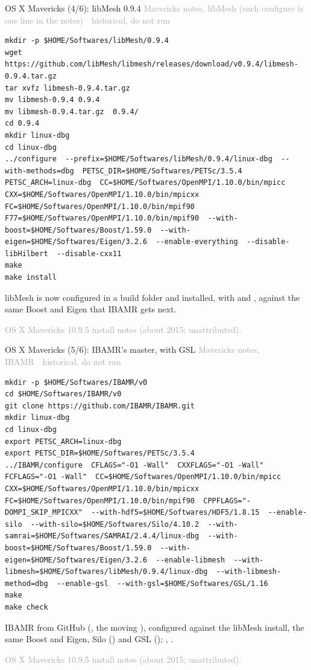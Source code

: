 \documentclass[aspectratio=169,11pt]{beamer}
\newcommand{\sourcecredit}[1]{\vfill\begin{flushright}\tiny\textcolor{DarkGray}{#1}\end{flushright}}
\newcommand{\hist}[1]{{\tiny\sffamily\textcolor{DarkGray}{#1\ \textbullet\ historical, do not run}}\par\nointerlineskip\vspace{0.3mm}}
\begin{document}
\begin{frame}[fragile]{OS X Mavericks (4/6): libMesh 0.9.4}
\label{fr:mav4}
\hist{Mavericks notes, libMesh (each configure is one line in the notes)}
\begin{lstlisting}[style=hist]
mkdir -p $HOME/Softwares/libMesh/0.9.4
wget https://github.com/libMesh/libmesh/releases/download/v0.9.4/libmesh-0.9.4.tar.gz
tar xvfz libmesh-0.9.4.tar.gz
mv libmesh-0.9.4 0.9.4
mv libmesh-0.9.4.tar.gz  0.9.4/
cd 0.9.4
mkdir linux-dbg
cd linux-dbg
../configure  --prefix=$HOME/Softwares/libMesh/0.9.4/linux-dbg  --with-methods=dbg  PETSC_DIR=$HOME/Softwares/PETSc/3.5.4  PETSC_ARCH=linux-dbg  CC=$HOME/Softwares/OpenMPI/1.10.0/bin/mpicc  CXX=$HOME/Softwares/OpenMPI/1.10.0/bin/mpicxx  FC=$HOME/Softwares/OpenMPI/1.10.0/bin/mpif90  F77=$HOME/Softwares/OpenMPI/1.10.0/bin/mpif90  --with-boost=$HOME/Softwares/Boost/1.59.0  --with-eigen=$HOME/Softwares/Eigen/3.2.6  --enable-everything  --disable-libHilbert  --disable-cxx11
make
make install
\end{lstlisting}
\footnotesize libMesh is now configured in a build folder and installed, with  and , against the same Boost and Eigen that IBAMR gets next.
\sourcecredit{OS X Mavericks 10.9.5 install notes (about 2015; unattributed).}
\end{frame}

\begin{frame}[fragile]{OS X Mavericks (5/6): IBAMR's master, with GSL}
\label{fr:mav5}
\hist{Mavericks notes, IBAMR}
\begin{lstlisting}[style=hist]
mkdir -p $HOME/Softwares/IBAMR/v0
cd $HOME/Softwares/IBAMR/v0
git clone https://github.com/IBAMR/IBAMR.git
mkdir linux-dbg
cd linux-dbg
export PETSC_ARCH=linux-dbg
export PETSC_DIR=$HOME/Softwares/PETSc/3.5.4
../IBAMR/configure  CFLAGS="-O1 -Wall"  CXXFLAGS="-O1 -Wall"  FCFLAGS="-O1 -Wall"  CC=$HOME/Softwares/OpenMPI/1.10.0/bin/mpicc  CXX=$HOME/Softwares/OpenMPI/1.10.0/bin/mpicxx  FC=$HOME/Softwares/OpenMPI/1.10.0/bin/mpif90  CPPFLAGS="-DOMPI_SKIP_MPICXX"  --with-hdf5=$HOME/Softwares/HDF5/1.8.15  --enable-silo  --with-silo=$HOME/Softwares/Silo/4.10.2  --with-samrai=$HOME/Softwares/SAMRAI/2.4.4/linux-dbg  --with-boost=$HOME/Softwares/Boost/1.59.0  --with-eigen=$HOME/Softwares/Eigen/3.2.6  --enable-libmesh  --with-libmesh=$HOME/Softwares/libMesh/0.9.4/linux-dbg  --with-libmesh-method=dbg  --enable-gsl  --with-gsl=$HOME/Softwares/GSL/1.16
make
make check
\end{lstlisting}
\footnotesize IBAMR from GitHub (, the moving ), configured against the libMesh install, the same Boost and Eigen, Silo () and GSL (); , .
\sourcecredit{OS X Mavericks 10.9.5 install notes (about 2015; unattributed).}
\end{frame}
\end{document}
